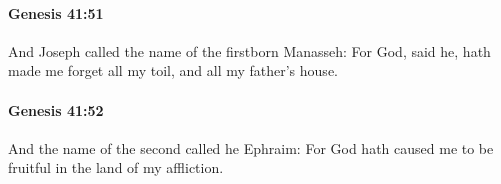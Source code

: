 		\paragraph{Genesis 41:51} %
			\label{GENESIS-41-51}

			And Joseph called the name of the firstborn Manasseh: For God, said he, hath made me forget all my toil, and all my father's house.


		\paragraph{Genesis 41:52} %
			\label{GENESIS-41-52}

			And the name of the second called he Ephraim: For God hath caused me to be fruitful in the land of my affliction.


